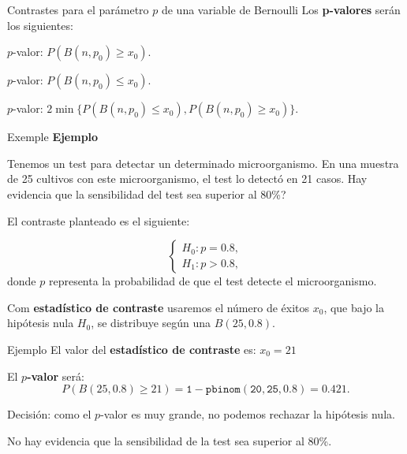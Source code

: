 \documentclass[
  ignorenonframetext,
]{beamer}
\begin{document}
\begin{frame}{Contrastes para el parámetro \(p\) de una variable de
Bernoulli}
\protect\hypertarget{contrastes-para-el-paruxe1metro-p-de-una-variable-de-bernoulli-2}{}
Los \textbf{p-valores} serán los siguientes:

\(p\)-valor: \(P(B(n,p_0)\geq x_0)\).

\(p\)-valor: \(P(B(n,p_0)\leq x_0)\).

\(p\)-valor: \(2\min\{P(B(n,p_0)\leq x_0),P(B(n,p_0)\geq x_0)\}\).
\end{frame}

\begin{frame}{Exemple}
\protect\hypertarget{exemple}{}
\textbf{Ejemplo}

Tenemos un test para detectar un determinado microorganismo. En una
muestra de 25 cultivos con este microorganismo, el test lo detectó en 21
casos. Hay evidencia que la sensibilidad del test sea superior al 80\%?

El contraste planteado es el siguiente:

\[\left\{\begin{array}{l}
H_0:p=0.8,\\
H_1:p>0.8,
\end{array}
\right.\] donde \(p\) representa la probabilidad de que el test detecte
el microorganismo.

Com \textbf{estadístico de contraste} usaremos el número de éxitos
\(x_0\), que bajo la hipótesis nula \(H_0\), se distribuye según una
\(B(25,0.8)\).
\end{frame}

\begin{frame}{Ejemplo}
\protect\hypertarget{ejemplo-14}{}
El valor del \textbf{estadístico de contraste} es: \(x_0=21\)

El \textbf{\(p\)-valor} será: \[
P(B(25,0.8)\geq 21) =\mathtt{1-pbinom(20,25,0.8)}= 0.421.
\]

Decisión: como el \(p\)-valor es muy grande, no podemos rechazar la
hipótesis nula.

No hay evidencia que la sensibilidad de la test sea superior al 80\%.
\end{frame}
\end{document}
